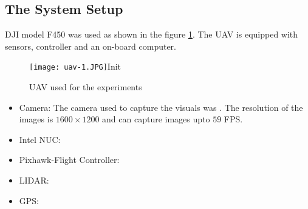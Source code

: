 \documentclass[12pt]{report}
\begin{document}
\subsection{The System Setup}
DJI model F450 \cite{dji_frame} was used as shown in the figure \ref{fig:dji_frame}. The UAV is equipped with sensors, controller and an on-board computer.

\begin{figure}[htp]
	\centering 
    \texttt{[image: uav-1.JPG]}Init
	\caption{UAV used for the experiments}
   \label{fig:dji_frame}
\end{figure}
\begin{itemize}
\item Camera: The camera used to capture the visuals was \cite{flea_camera}. The resolution of the images is $1600 \times 1200$ and can capture images upto $59$ FPS.
\item Intel NUC:
\item Pixhawk-Flight Controller:
\item LIDAR:
\item GPS: 
\end{itemize}
\end{document}
